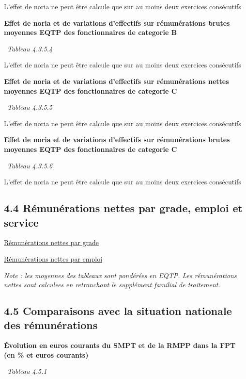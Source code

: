 L'effet de noria ne peut être calcule que sur au moins deux exercices
consécutifs

\textbf{Effet de noria et de variations d'effectifs sur rémunérations
brutes moyennes EQTP des fonctionnaires de categorie B}

~\emph{Tableau 4.3.5.4}

L'effet de noria ne peut être calcule que sur au moins deux exercices
consécutifs

\textbf{Effet de noria et de variations d'effectifs sur rémunérations
nettes moyennes EQTP des fonctionnaires de categorie C}

~\emph{Tableau 4.3.5.5}

L'effet de noria ne peut être calcule que sur au moins deux exercices
consécutifs

\textbf{Effet de noria et de variations d'effectifs sur rémunérations
brutes moyennes EQTP des fonctionnaires de categorie C}

~\emph{Tableau 4.3.5.6}

L'effet de noria ne peut être calcule que sur au moins deux exercices
consécutifs

\hypertarget{remunerations-nettes-par-grade-emploi-et-service}{%
\subsection{4.4 Rémunérations nettes par grade, emploi et
service}\label{remunerations-nettes-par-grade-emploi-et-service}}

\href{../Bases/Remunerations/net.grades.csv}{Rémunérations nettes par
grade}

\href{../Bases/Remunerations/net.emplois.csv}{Rémunérations nettes par
emploi}

\emph{Note : les moyennes des tableaux sont pondérées en EQTP. Les
rémunérations nettes sont calculees en retranchant le supplément
familial de traitement.}

\hypertarget{comparaisons-avec-la-situation-nationale-des-remunerations}{%
\subsection{4.5 Comparaisons avec la situation nationale des
rémunérations}\label{comparaisons-avec-la-situation-nationale-des-remunerations}}

\textbf{Évolution en euros courants du SMPT et de la RMPP dans la FPT
(en \% et euros courants)}

~\emph{Tableau 4.5.1}

